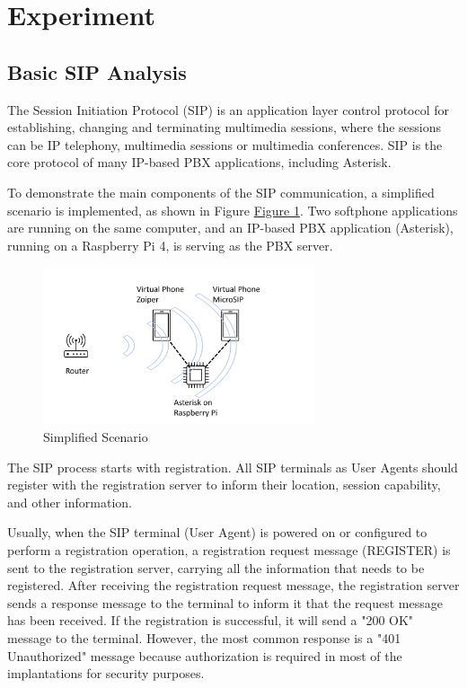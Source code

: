 \section{Experiment}	\label{sec:experiments}

	\subsection{Basic SIP Analysis}
		The Session Initiation Protocol (SIP) is an application layer control protocol for establishing, changing and terminating multimedia sessions, where the sessions can be IP telephony, multimedia sessions or multimedia conferences. SIP is the core protocol of many IP-based PBX applications, including Asterisk.
		
		To demonstrate the main components of the SIP communication, a simplified scenario is implemented, as shown in Figure  \hyperref[fig:topo]{Figure \ref{fig:topo}}. Two softphone applications are running on the same computer, and an IP-based PBX application (Asterisk), running on a Raspberry Pi 4, is serving as the PBX server.
		
		\begin{figure}[htbp]
			\centerline{\includegraphics[width=8cm]{Images/experiment/exp1.png}}
			\caption{Simplified Scenario}
			\label{fig:topo}
		\end{figure}
		
		The SIP process starts with registration. All SIP terminals as User Agents should register with the registration server to inform their location, session capability, and other information.
		
		Usually, when the SIP terminal (User Agent) is powered on or configured to perform a registration operation, a registration request message (REGISTER) is sent to the registration server, carrying all the information that needs to be registered. After receiving the registration request message, the registration server sends a response message to the terminal to inform it that the request message has been received. If the registration is successful, it will send a "200 OK" message to the terminal. However, the most common response is a "401 Unauthorized" message because authorization is required in most of the implantations for security purposes. 
		
